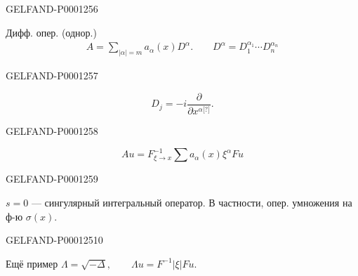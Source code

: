 \begin{GelfandAdjacentEvidence}{GELFAND-P000125}{6}

Дифф. опер. (однор.)
\begin{gather*}
A=\sum_{|\alpha|=m}a_\alpha(x)D^\alpha.\qquad D^\alpha=D_1^{\alpha_1}\cdots D_n^{\alpha_n}
\end{gather*}
\end{GelfandAdjacentEvidence}
\begin{GelfandAdjacentEvidence}{GELFAND-P000125}{7}

\begin{equation*}D_j=-i\frac{\partial}{\partial x^{\alpha\text{[?]}}}.\end{equation*}
\end{GelfandAdjacentEvidence}
\begin{GelfandAdjacentEvidence}{GELFAND-P000125}{8}

\begin{equation*}Au=F^{-1}_{\xi\to x}\sum a_\alpha(x)\xi^\alpha Fu\end{equation*}
\end{GelfandAdjacentEvidence}
\begin{GelfandAdjacentEvidence}{GELFAND-P000125}{9}

\underline{$s=0$} — сингулярный интегральный оператор.
В частности, опер. умножения на ф-ю $\sigma(x)$.
\end{GelfandAdjacentEvidence}
\begin{GelfandAdjacentEvidence}{GELFAND-P000125}{10}

Ещё пример $\Lambda=\sqrt{-\Delta},\qquad\Lambda u=F^{-1}|\xi|Fu$.
\end{GelfandAdjacentEvidence}
